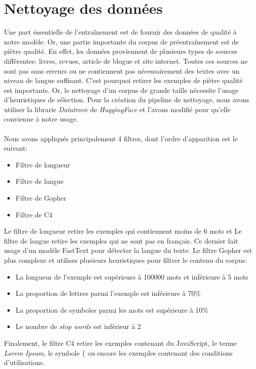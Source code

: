 \documentclass[12pt,twoside,maitrise]{dms}
\theoremstyle{definition}
\numberwithin{equation}{section}
\numberwithin{table}{chapter}
\numberwithin{figure}{chapter}
\begin{document}
\section{Nettoyage des données}
Une part éssentielle de l'entraînement est de fournir des données de qualité
à notre modèle. Or, une partie importante du corpus de préentraînement est
de piètre qualité. En effet, les données proviennent de plusieurs types de
sources différentes: livres, revues, article de blogue et site internet. Toutes
ces sources ne sont pas sans erreurs ou ne contiennent pas nécessairement des
textes avec un niveau de langue suffisant. C'est pourquoi retirer les exemples
de piètre qualité est importants. Or, le nettoyage d'un corpus de grande
taille nécessite l'usage d'heuristiques de sélection. Pour la création du
pipeline de nettoyage, nous avons utiliser la librarie \textit{Datatrove} de
\textit{HuggingFace} \cite{penedo2024datatrove} et l'avons modifié pour qu'elle
convienne à notre usage.\\
\\
Nous avons appliqués principalement 4 filtres, dont l'ordre d'apparition est le suivant:
\begin{itemize}
	\item Filtre de longueur
	\item Filtre de langue
	\item Filtre de Gopher
	\item Filtre de C4
\end{itemize}
Le filtre de longueur retire les exemples qui contiennent moins de 6 mots
et Le filtre de langue retire les exemples qui ne sont pas en français. Ce
dernier fait usage d'un modèle FastText \cite{joulin2016fasttext} pour détecter
la langue du texte. Le filtre Gopher est plus complexe et utilises plusieurs
heuristiques pour filtrer le contenu du corpus:
\begin{itemize}
	\item La longueur de l'exemple est supérieure à 100000 mots et inférieure à 5 mots
	\item La proportion de lettres parmi l'exemple est inférieure à 70\%
	\item La proportion de symboles parmi les mots est supérieure à 10\%
	\item Le nombre de \textit{stop words} est inférieur à 2
\end{itemize}
Finalement, le filtre C4 retire les exemples contenant du JavaScript, le terme
\textit{Lorem Ipsum}, le symbole $\{$  ou encore les exemples contenant des
conditions d'utilisations.\\
\end{document}
